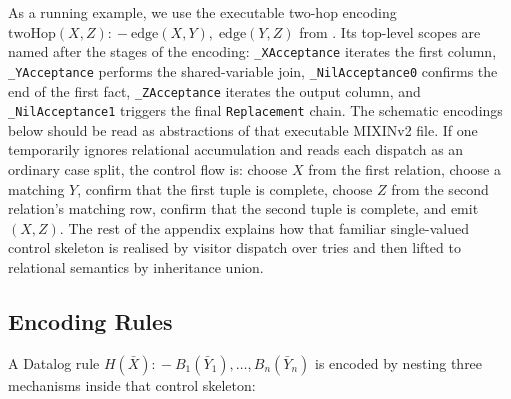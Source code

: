 As a running example, we use the executable two-hop encoding
$\mathrm{twoHop}(X, Z) \mathrel{{:}\!{-}} \mathrm{edge}(X, Y),\; \mathrm{edge}(Y, Z)$
from
.
Its top-level scopes are named after the stages of the
encoding: \texttt{\_XAcceptance} iterates the first column,
\texttt{\_YAcceptance} performs the shared-variable join,
\texttt{\_NilAcceptance0} confirms the end of the first fact,
\texttt{\_ZAcceptance} iterates the output column, and
\texttt{\_NilAcceptance1} triggers the final
\texttt{Replacement} chain.
The schematic encodings below should be read as abstractions
of that executable MIXINv2 file.
If one temporarily ignores relational accumulation and reads
each dispatch as an ordinary case split, the control flow is:
choose $X$ from the first relation, choose a matching $Y$,
confirm that the first tuple is complete, choose $Z$ from the
second relation's matching row, confirm that the second tuple
is complete, and emit $(X, Z)$.
The rest of the appendix explains how that familiar
single-valued control skeleton is realised by visitor dispatch
over tries and then lifted to relational semantics by
inheritance union.

\subsection{Encoding Rules}

A Datalog rule $H(\bar{X}) \mathrel{{:}\!{-}} B_1(\bar{Y}_1), \ldots, B_n(\bar{Y}_n)$
is encoded by nesting three mechanisms inside that control
skeleton:

